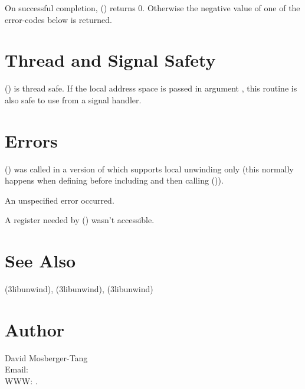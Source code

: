 \documentclass{article}
\begin{document}
On successful completion, () returns 0.
Otherwise the negative value of one of the error-codes below is
returned.

\section{Thread and Signal Safety}

() is thread safe.  If the local address space
is passed in argument , this routine is also safe to use from
a signal handler.

\section{Errors}

\begin{Description}
\item[\Const{UNW\_EINVAL}] () was called in a
  version of  which supports local unwinding only
  (this normally happens when defining  before
  including  and then calling
  ()).
\item[\Const{UNW\_EUNSPEC}] An unspecified error occurred.
\item[\Const{UNW\_EBADREG}] A register needed by ()
  wasn't accessible.
\end{Description}

\section{See Also}

(3libunwind),
(3libunwind),
(3libunwind)

\section{Author}

\noindent
David Mosberger-Tang\\
Email: \\
WWW: .
\LatexManEnd
\end{document}
